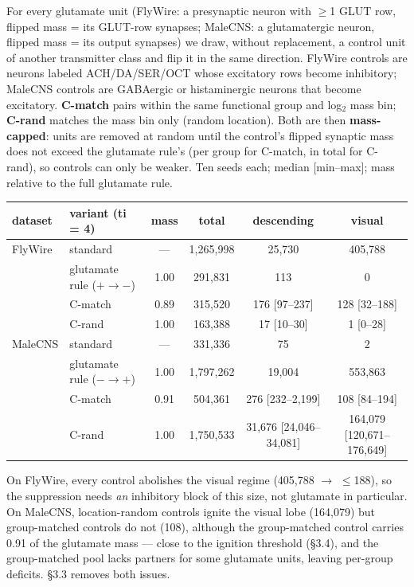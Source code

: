 \documentclass[11pt,a4paper]{article}
\begin{document}
For every glutamate unit (FlyWire: a presynaptic neuron with $\ge$1 GLUT row,
flipped mass = its GLUT-row synapses; MaleCNS: a glutamatergic neuron,
flipped mass = its output synapses) we draw, without replacement, a control
unit of another transmitter class and flip it in the same direction.
FlyWire controls are neurons labeled ACH/DA/SER/OCT whose excitatory rows
become inhibitory; MaleCNS controls are GABAergic or histaminergic neurons that
become excitatory. \textbf{C-match} pairs within the same functional group and
log$_2$ mass bin; \textbf{C-rand} matches the mass bin only (random
location). Both are then \textbf{mass-capped}: units are removed at random
until the control's flipped synaptic mass does not exceed the glutamate rule's
(per group for C-match, in total for C-rand), so controls can only be weaker.
Ten seeds each; median [min--max]; mass relative to the full glutamate rule.

\begin{center}
\footnotesize
\setlength{\tabcolsep}{4pt}
\begin{tabular}{llcccc}
\toprule
dataset & variant (ti = 4) & mass & total & descending & visual \\
\midrule
FlyWire & standard & --- & 1,265,998 & 25,730 & 405,788 \\
 & glutamate rule ($+\to-$) & 1.00 & 291,831 & 113 & 0 \\
 & C-match & 0.89 & 315,520 & 176 [97--237] & 128 [32--188] \\
 & C-rand & 1.00 & 163,388 & 17 [10--30] & 1 [0--28] \\
\midrule
MaleCNS & standard & --- & 331,336 & 75 & 2 \\
 & glutamate rule ($-\to+$) & 1.00 & 1,797,262 & 19,004 & 553,863 \\
 & C-match & 0.91 & 504,361 & 276 [232--2,199] & 108 [84--194] \\
 & C-rand & 1.00 & 1,750,533 & 31,676 [24,046--34,081] & 164,079 [120,671--176,649] \\
\bottomrule
\end{tabular}
\end{center}

On FlyWire, every control abolishes the visual regime (405,788 $\to$
$\le$188), so the suppression needs \emph{an} inhibitory block of this size,
not glutamate in particular. On MaleCNS, location-random controls ignite the
visual lobe (164,079) but group-matched controls do not (108), although the
group-matched control carries 0.91 of the glutamate mass --- close to the
ignition threshold (\S3.4), and the group-matched pool lacks partners for some
glutamate units, leaving per-group deficits. \S3.3 removes both issues.
\end{document}
